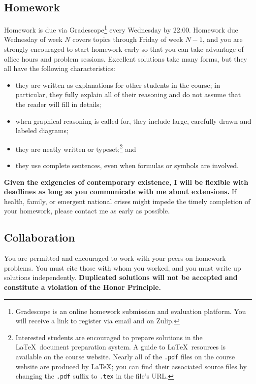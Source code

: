 \documentclass[11pt,twoside]{amsart}
\begin{document}
\subsection*{Homework}
Homework is due via Gradescope\footnote{Gradescope is an online homework submission and evaluation platform. You will receive a link to register via email and on Zulip.} every Wednesday by 22:00. Homework due Wednesday of week $N$ covers topics through Friday of week $N-1$, and you are strongly encouraged to start homework early so that you can take advantage of office hours and problem sessions.  Excellent solutions take many forms, but they all have the following characteristics:

\begin{itemize}
\item they are written as explanations for other students in the course; in particular, they fully explain all of their reasoning and do not assume that the reader will fill in details;
\item when graphical reasoning is called for, they include large, carefully drawn and labeled diagrams;
\item they are neatly written or typeset;\footnote{Interested students are 
encouraged to prepare solutions in the \LaTeX~document preparation 
system.  A guide to \LaTeX~resources is available on the course 
website.  Nearly all of the \texttt{.pdf} files on the course website are produced by \LaTeX; you can find their associated source files by changing the \texttt{.pdf} suffix to \texttt{.tex} in the file's URL.} and
\item they use complete sentences, even when formulas or symbols are involved.
\end{itemize}

\textbf{Given the exigencies of contemporary existence, I will be flexible with deadlines as long as you communicate with me about extensions.} If health, family, or emergent national crises might impede the timely completion of your homework, please contact me as early as possible.

\subsection*{Collaboration}
You are permitted and encouraged to work with your peers on homework problems.  You must cite those with whom you worked, and you must write up solutions independently.  \textbf{Duplicated solutions will not be accepted and constitute a violation of the Honor Principle.}
\end{document}
